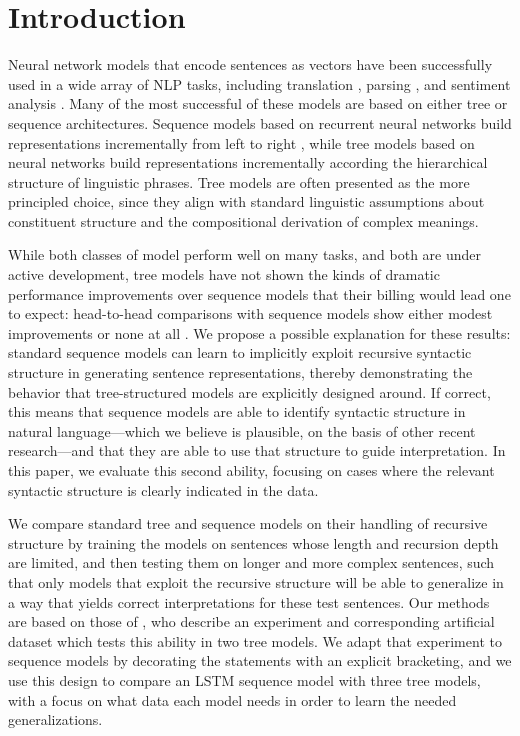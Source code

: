 \section{Introduction}\label{sec:intro}

Neural network models that encode sentences as vectors have been successfully used in a wide array of NLP tasks, including translation \cite{sutskever2014sequence}, parsing \cite{dyer2015transition}, and sentiment analysis \cite{tai2015improved}. Many of the most successful of these models are based on either tree or sequence architectures. Sequence models based on recurrent neural networks build representations incrementally from left to right \cite{elman1990finding,sutskever2014sequence}, while tree models based on  neural networks \cite{goller1996learning,socher2011semi} build representations incrementally according the hierarchical structure of linguistic phrases. Tree models are often presented as the more principled choice, since they align with standard linguistic assumptions about constituent structure and the compositional derivation of complex meanings.

While both classes of model perform %
well on many tasks, and both are under active development, tree models have not shown the kinds of dramatic performance improvements over sequence models that their billing would lead one to expect: head-to-head comparisons with sequence models show either modest improvements \cite{tai2015improved} or none at all \cite{li2015tree}. We propose a possible explanation for these results: standard sequence models can learn to implicitly exploit recursive syntactic structure in generating sentence representations, thereby demonstrating the behavior that tree-structured models are explicitly designed around. If correct, this means that
sequence models are able to identify syntactic structure in natural language---which we believe is plausible, on the basis of other recent research---and that they are able to use that structure to guide interpretation. %
In this paper, we  evaluate this second ability, focusing on cases where the relevant syntactic structure is clearly indicated in the data.

We compare standard tree and sequence models on their handling of recursive structure by training the models on sentences whose length and recursion depth are limited, and then testing them on longer and more complex sentences, such that only models that exploit the recursive structure will be able to generalize in a way that yields correct interpretations for these test sentences. Our methods are based on those of , who describe an experiment and corresponding artificial dataset which tests this ability in two tree models. We adapt that experiment to sequence models by decorating the statements with an explicit bracketing, and we use this design to compare an LSTM sequence model with three tree models, with a focus on what data each model needs in order to learn the needed generalizations.

